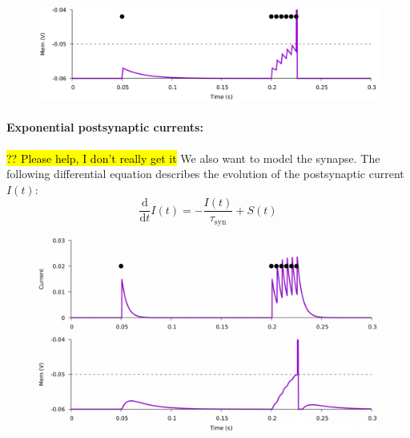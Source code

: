 \documentclass[main]{subfiles}
\begin{document}
\paragraph{}
\begin{figure}[H]
    \centering
    \includegraphics[width=0.6\linewidth]{10_DeepLearningWithSpikes/figures/leaky_ifn.png}
    \caption{}
    \label{fig:my_label}
\end{figure}
%
\paragraph{Exponential postsynaptic currents: }
\hl{?? Please help, I don't really get it}
We also want to model the synapse. The following differential equation describes the evolution of the postsynaptic current $I(t)$:
%
\begin{equation}
\frac{\mathrm{d}}{\mathrm{d} t} I(t)=-\frac{I(t)}{\tau_{\mathrm{syn}}}+S(t)
\end{equation}
%
\begin{figure}[H]
    \centering
    \includegraphics[width=0.55\linewidth]{10_DeepLearningWithSpikes/figures/exp_ps_current.png}
    \caption{}
    \label{fig:my_label}
\end{figure}
%
\end{document}
